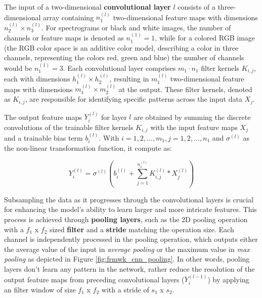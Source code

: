 The input of a two-dimensional \textbf{convolutional layer} $l$ consists of a three-dimensional array containing $n_1^{(l)}$ two-dimensional feature maps with dimensions $n_2^{(l)} \times n_3^{(l)}$. For spectrograms or black and white images, the number of channels or feature maps is denoted as $n_1^{(1)}=1$, while for a colored RGB image (the RGB color space is an additive color model, describing a color in three channels, representing the colors red, green and blue) the number of channels would be $n_1^{(1)}=3$. Each convolutional layer comprises $m_1 \cdot n_1$ filter kernels $K_{i,j}$, each with dimensions $h_1^{(l)} \times h_2^{(l)}$, resulting in $m_1^{(l)}$ two-dimensional feature maps with dimensions $m_1^{(l)} \times m_2^{(l)}$ at the output. These filter kernels, denoted as $K_{i,j}$, are responsible for identifying specific patterns across the input data $X_j$. 

The output feature maps $Y_i^{(l)}$ for layer $l$ are obtained by summing the discrete convolutions of the trainable filter kernels $K_{i,j}$ with the input feature maps $X_j$ and a trainable bias term $b_i^{(l)}$. With $i = 1, 2,\ldots, m_1, j = 1, 2,\ldots, n_1$ and $\sigma^{(l)}$ as the non-linear transformation function, it compute as:

\begin{equation}
    \label{eq:cnn_convolutional_layer}
    Y_i^{(l)}=\sigma^{(l)}\left(b_i^{(l)}+\sum_{j=1}^{n_1^{(l)}} K_{i, j}^{(l)} * X_j^{(l)}\right)
\end{equation}


Subsampling the data as it progresses through the convolutional layers is crucial for enhancing the model's ability to learn larger and more intricate features. This process is achieved through \textbf{pooling layers}, such as the 2D pooling operation with a $f_1$ x $f_2$ sized \textbf{filter} and a \textbf{stride} matching the operation size. Each channel is independently processed in the pooling operation, which outputs either the average value of the input in \textit{average pooling} or the maximum value in \textit{max pooling} as depicted in Figure \ref{fig:frmwk_cnn_pooling}. In other words, pooling layers don't learn any pattern in the network, rather reduce the resolution of the output feature maps from preceding convolutional layers ($Y_i^{(l-1)}$) by applying an filter window of size $f_1$ x $f_2$ with a stride of $s_1$ x $s_2$.

